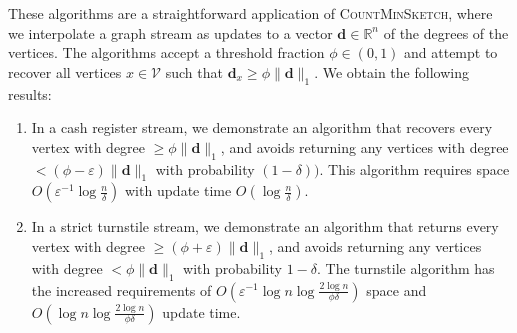 \documentclass{report}
\newcommand{\algoname}[1]{\textnormal{\textsc{#1}}}
\begin{document}
These algorithms are a straightforward application of \algoname{CountMinSketch}, where we interpolate a graph stream as updates to a vector $\mathbf{d} \in \mathbb{R}^n$ of the degrees of the vertices.
The algorithms accept a threshold fraction $\phi \in (0,1)$ and attempt to recover all vertices $x \in \mathcal{V}$ such that $\mathbf{d}_x \geq \phi \|\mathbf{d}\|_1$.
We obtain the following results:
\begin{enumerate}
	\item In a cash register stream, we demonstrate an algorithm that recovers every vertex with degree $\geq \phi \|\mathbf{d}\|_1$, and avoids returning any vertices with degree $< (\phi - \varepsilon) \|\mathbf{d}\|_1$ with probability $(1-\delta))$.
This algorithm requires space $O(\varepsilon^{-1} \log \frac{n}{\delta})$ with update time $O(\log \frac{n}{\delta})$.
	\item In a strict turnstile stream, we demonstrate an algorithm that returns every vertex with degree $\geq (\phi + \varepsilon) \|\mathbf{d}\|_1$, and avoids returning any vertices with degree $< \phi \|\mathbf{d}\|_1$ with probability $1 - \delta$. 
The turnstile algorithm has the increased requirements of $O(\varepsilon^{-1} \log n \log \frac{2 \log n}{\phi \delta})$ space and $O(\log n \log \frac{2\log n}{\phi \delta})$ update time.
\end{enumerate}
\end{document}
